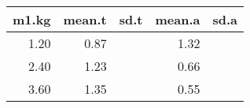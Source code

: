 \begin{table}[ht]
\centering
\begin{tabular}{rrrrr}
  \hline
m1.kg & mean.t & sd.t & mean.a & sd.a \\ 
  \hline
1.20 & 0.87 &  & 1.32 &  \\ 
  2.40 & 1.23 &  & 0.66 &  \\ 
  3.60 & 1.35 &  & 0.55 &  \\ 
   \hline
\end{tabular}
\end{table}
